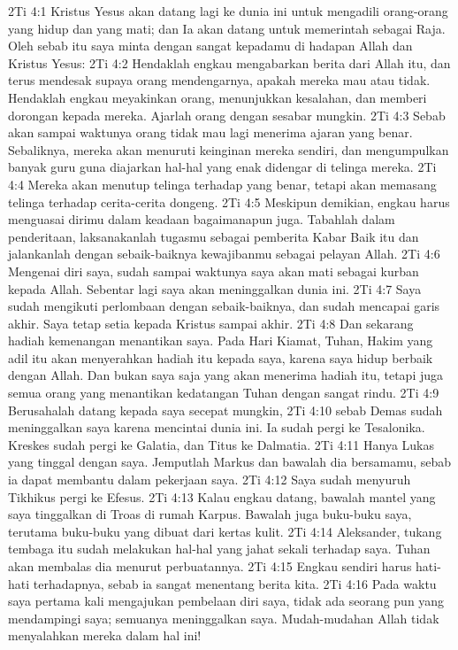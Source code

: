 2Ti 4:1  Kristus Yesus akan datang lagi ke dunia ini untuk mengadili orang-orang yang hidup dan yang mati; dan Ia akan datang untuk memerintah sebagai Raja. Oleh sebab itu saya minta dengan sangat kepadamu di hadapan Allah dan Kristus Yesus:
2Ti 4:2  Hendaklah engkau mengabarkan berita dari Allah itu, dan terus mendesak supaya orang mendengarnya, apakah mereka mau atau tidak. Hendaklah engkau meyakinkan orang, menunjukkan kesalahan, dan memberi dorongan kepada mereka. Ajarlah orang dengan sesabar mungkin.
2Ti 4:3  Sebab akan sampai waktunya orang tidak mau lagi menerima ajaran yang benar. Sebaliknya, mereka akan menuruti keinginan mereka sendiri, dan mengumpulkan banyak guru guna diajarkan hal-hal yang enak didengar di telinga mereka.
2Ti 4:4  Mereka akan menutup telinga terhadap yang benar, tetapi akan memasang telinga terhadap cerita-cerita dongeng.
2Ti 4:5  Meskipun demikian, engkau harus menguasai dirimu dalam keadaan bagaimanapun juga. Tabahlah dalam penderitaan, laksanakanlah tugasmu sebagai pemberita Kabar Baik itu dan jalankanlah dengan sebaik-baiknya kewajibanmu sebagai pelayan Allah.
2Ti 4:6  Mengenai diri saya, sudah sampai waktunya saya akan mati sebagai kurban kepada Allah. Sebentar lagi saya akan meninggalkan dunia ini.
2Ti 4:7  Saya sudah mengikuti perlombaan dengan sebaik-baiknya, dan sudah mencapai garis akhir. Saya tetap setia kepada Kristus sampai akhir.
2Ti 4:8  Dan sekarang hadiah kemenangan menantikan saya. Pada Hari Kiamat, Tuhan, Hakim yang adil itu akan menyerahkan hadiah itu kepada saya, karena saya hidup berbaik dengan Allah. Dan bukan saya saja yang akan menerima hadiah itu, tetapi juga semua orang yang menantikan kedatangan Tuhan dengan sangat rindu.
2Ti 4:9  Berusahalah datang kepada saya secepat mungkin,
2Ti 4:10  sebab Demas sudah meninggalkan saya karena mencintai dunia ini. Ia sudah pergi ke Tesalonika. Kreskes sudah pergi ke Galatia, dan Titus ke Dalmatia.
2Ti 4:11  Hanya Lukas yang tinggal dengan saya. Jemputlah Markus dan bawalah dia bersamamu, sebab ia dapat membantu dalam pekerjaan saya.
2Ti 4:12  Saya sudah menyuruh Tikhikus pergi ke Efesus.
2Ti 4:13  Kalau engkau datang, bawalah mantel yang saya tinggalkan di Troas di rumah Karpus. Bawalah juga buku-buku saya, terutama buku-buku yang dibuat dari kertas kulit.
2Ti 4:14  Aleksander, tukang tembaga itu sudah melakukan hal-hal yang jahat sekali terhadap saya. Tuhan akan membalas dia menurut perbuatannya.
2Ti 4:15  Engkau sendiri harus hati-hati terhadapnya, sebab ia sangat menentang berita kita.
2Ti 4:16  Pada waktu saya pertama kali mengajukan pembelaan diri saya, tidak ada seorang pun yang mendampingi saya; semuanya meninggalkan saya. Mudah-mudahan Allah tidak menyalahkan mereka dalam hal ini!
